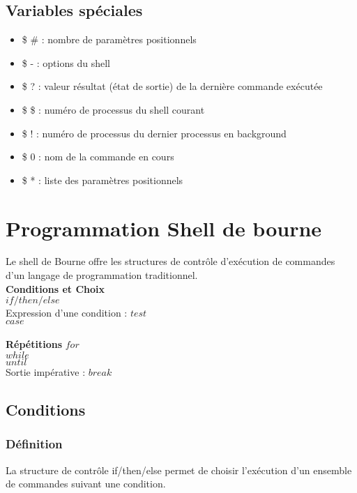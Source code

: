 			\subsection{Variables spéciales}			
				\begin{itemize}							
					\item \$ #	: nombre de paramètres positionnels
					\item \$ -	: options du shell
					\item \$ ?	: valeur résultat (état de sortie) de la dernière commande exécutée
					\item \$ \$	: numéro de processus du shell courant
					\item \$ !	: numéro de processus du dernier processus en background
					\item \$ 0	: nom de la commande en cours
					\item \$ *	: liste des paramètres positionnels
				\end{itemize}
				
		\section{Programmation Shell de bourne}
			Le shell de Bourne offre les structures de contrôle d'exécution de commandes d'un langage de programmation traditionnel.\\
			\textbf{Conditions et Choix}\\
			$if/then/else$\\
			Expression d'une condition : $test$\\
			$case$\\ \\
			\textbf{Répétitions}
			$for$\\
			$while$\\
			$until$\\
			Sortie impérative : $break$\\
			\subsection{Conditions}
			    \subsubsection{Définition}
					La structure de contrôle if/then/else permet de choisir l'exécution d'un ensemble de commandes suivant une condition.
